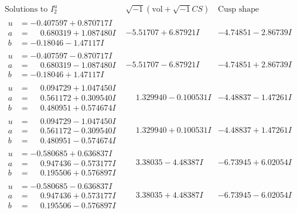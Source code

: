 \documentclass[1p]{elsarticle_modified}
\theoremstyle{definition}
\newcommand{\I}{\sqrt{-1}}
\begin{document}
$$\begin{array}{c|c|c}  
\text{Solutions to }I^u_{2}& \I (\text{vol} + \sqrt{-1}CS) & \text{Cusp shape}\\
 \hline 
\begin{aligned}
u &= -0.407597 + 0.870717 I \\
a &= \phantom{-}0.680319 + 1.087480 I \\
b &= -0.18046 - 1.47117 I\end{aligned}
 & -5.51707 + 6.87921 I & -4.74851 - 2.86739 I \\ \hline\begin{aligned}
u &= -0.407597 - 0.870717 I \\
a &= \phantom{-}0.680319 - 1.087480 I \\
b &= -0.18046 + 1.47117 I\end{aligned}
 & -5.51707 - 6.87921 I & -4.74851 + 2.86739 I \\ \hline\begin{aligned}
u &= \phantom{-}0.094729 + 1.047450 I \\
a &= \phantom{-}0.561172 + 0.309540 I \\
b &= \phantom{-}0.480951 + 0.574674 I\end{aligned}
 & \phantom{-}1.329940 - 0.100531 I & -4.48837 - 1.47261 I \\ \hline\begin{aligned}
u &= \phantom{-}0.094729 - 1.047450 I \\
a &= \phantom{-}0.561172 - 0.309540 I \\
b &= \phantom{-}0.480951 - 0.574674 I\end{aligned}
 & \phantom{-}1.329940 + 0.100531 I & -4.48837 + 1.47261 I \\ \hline\begin{aligned}
u &= -0.580685 + 0.636837 I \\
a &= \phantom{-}0.947436 - 0.573177 I \\
b &= \phantom{-}0.195506 + 0.576897 I\end{aligned}
 & \phantom{-}3.38035 - 4.48387 I & -6.73945 + 6.02054 I \\ \hline\begin{aligned}
u &= -0.580685 - 0.636837 I \\
a &= \phantom{-}0.947436 + 0.573177 I \\
b &= \phantom{-}0.195506 - 0.576897 I\end{aligned}
 & \phantom{-}3.38035 + 4.48387 I & -6.73945 - 6.02054 I \\ \hline\begin{aligned}

\end{aligned}
\end{array}$$
\end{document}
